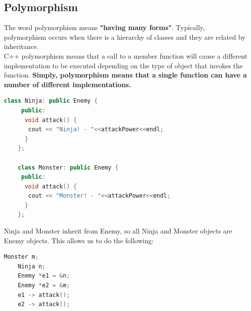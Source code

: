 \documentclass[12pt , a4paper]{article}
\begin{document}
	\subsection{Polymorphism}
	The word polymorphism means \textbf{"having many forms"}.
	Typically, polymorphism occurs when there is a hierarchy of classes and they are related by inheritance.\\
	C++ polymorphism means that a call to a member function will cause a different implementation to be executed depending on the type of object that invokes the function. \textbf{Simply, polymorphism means that a single function can have a number of different implementations.}
	\begin{lstlisting}[language=C++]
	class Ninja: public Enemy {
	 public:
	  void attack() {
	   cout << "Ninja! - "<<attackPower<<endl;
	  }
	};
	
	class Monster: public Enemy {
	 public:
	  void attack() {
	   cout << "Monster! - "<<attackPower<<endl;
	  }
	};
	\end{lstlisting}

	Ninja and Monster inherit from Enemy, so all Ninja and Monster objects are Enemy objects. This allows us to do the following:\\
	\begin{lstlisting}[language=C++]
	Monster m;
	Ninja n;
	Enemy *e1 = &n;
	Enemy *e2 = &m;	
	e1 -> attack();
	e2 -> attack();
	\end{lstlisting}
\end{document}
